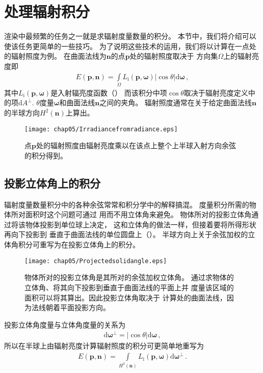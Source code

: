 \section{处理辐射积分}\label{sec:处理辐射积分}

渲染中最频繁的任务之一就是求辐射度量数量的积分。
本节中，我们将介绍可以使该任务更简单的一些技巧。
为了说明这些技术的运用，我们将以计算在一点处的辐射照度为例。
在曲面法线为$\bm n$的点$\bm p$处的辐射照度取决于
方向集$\Omega$上的辐射亮度即
\begin{align}\label{eq:5.4}
    E({\bm p},{\bm n})=\int\limits_{\Omega}{L_{\mathrm{i}}({\bm p},{\bm\omega})|\cos\theta|\mathrm{d}\bm\omega}\, ,
\end{align}
其中$L_{\mathrm{i}}({\bm p},{\bm\omega})$是入射辐亮度函数（）
而该积分中项$\cos\theta$取决于辐射亮度定义中的项$\mathrm{d}A^{\perp}$.
$\theta$度量$\bm\omega$和曲面法线$\bm n$之间的夹角。
辐射照度通常在关于给定曲面法线$\bm n$的半球方向$H^2(\bm n)$上算出。
\begin{figure}[htbp]
    \centering\texttt{[image: chap05/Irradiancefromradiance.eps]}
    \caption{点$\bm p$处的辐射照度由辐射亮度乘以在该点上整个上半球入射方向余弦的积分得到。}
    \label{fig:5.12}
\end{figure}

\subsection{投影立体角上的积分}\label{sub:投影立体角上的积分}
辐射度量数量积分中的各种余弦常常和积分学中的解释搞混。
度量积分所需的物体所对面积时这个问题可通过
用而不用立体角来避免。
物体所对的投影立体角通过将该物体投影到单位球上决定，
这和立体角的做法一样，但接着要将所得形状再向下投影到
垂直于曲面法线的单位圆盘上（）。
半球方向上关于余弦加权的立体角积分可重写为在投影立体角上的积分。
\begin{figure}[htbp]
    \centering\texttt{[image: chap05/Projectedsolidangle.eps]}
    \caption{物体所对的投影立体角是其所对的余弦加权立体角。
        通过求物体的立体角、将其向下投影到垂直于曲面法线的平面上并
        度量该区域的面积可以将其算出。因此投影立体角取决于
        计算处的曲面法线，因为法线朝着平面投影方向。}
    \label{fig:5.13}
\end{figure}

投影立体角度量与立体角度量的关系为
\begin{align*}
    \mathrm{d}{\bm\omega}^{\perp}=|\cos\theta|\mathrm{d}{\bm\omega}\, ,
\end{align*}
所以在半球上由辐射亮度计算辐射照度的积分可更简单地重写为
\begin{align*}
    E({\bm p},{\bm n})=\int\limits_{H^2({\bm n})}{L_{\mathrm{i}}({\bm p},{\bm\omega})\mathrm{d}{\bm\omega}^{\perp}}\, .
\end{align*}

